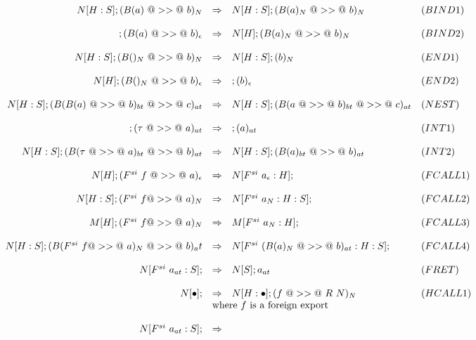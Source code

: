 \documentclass{article}
\newcommand{\hcall}{H}
\newcommand{\fcall}[2]{F^{#1}~#2}
\newcommand{\ret}[1]{R~#1}
\newcommand{\bound}[1]{B(#1)}
\begin{document}
$$
\begin{array}{rcll}
N[\hcall:S]; (\bound{a}~@>>@~b)_{N} 
	& \Rightarrow 
	& N[\hcall:S]; (\bound{a}_N~@>>@~b)_{N} & (BIND1) \\
\\
; (\bound{a}~@>>@~b)_{\epsilon} 
	& \Rightarrow 
	& N[\hcall]; (\bound{a}_N~@>>@~b)_{N} & (BIND2) \\
\\
N[\hcall:S]; (\bound{}_N~@>>@~b)_N 
	& \Rightarrow 
	& N[\hcall:S]; (b)_N & (END1) \\
\\
N[\hcall]; (\bound{}_N~@>>@~b)_{\epsilon} 
	& \Rightarrow 
	& ; (b)_{\epsilon} & (END2) \\
\\
N[\hcall:S]; (\bound{\bound{a}~@>>@~b}_{bt}~@>>@~c)_{at} 
	& \Rightarrow 
	& N[\hcall:S]; (\bound{a~@>>@~b}_{bt}~@>>@~c)_{at} & (NEST) \\
\\
; (\tau~@>>@~a)_{at} 
	& \Rightarrow 
	& ; (a)_{at} & (INT1) \\
\\
N[\hcall:S]; (\bound{\tau~@>>@~a}_{bt}~@>>@~b)_{at} 
	& \Rightarrow 
	& N[\hcall:S]; (\bound{a}_{bt}~@>>@~b)_{at} & (INT2) \\
\\
N[\hcall]; (\fcall{si}{f}~@>>@~a)_{\epsilon} 
	& \Rightarrow 
	& N[\fcall{si}{a_\epsilon}:\hcall];  & (FCALL1) \\
\\
N[\hcall:S]; (\fcall{si}{f}@>>@~a)_N 
	& \Rightarrow 
	& N[\fcall{si}{a_N}:\hcall:S];  & (FCALL2) \\
\\
M[\hcall]; (\fcall{si}{f}@>>@~a)_N
	& \Rightarrow 
	& M[\fcall{si}{a_N}:\hcall];  & (FCALL3) \\
\\
N[\hcall:S]; (\bound{\fcall{si}{f}@>>@~a}_N~@>>@~b)_at
	& \Rightarrow 
	& N[\fcall{si}{(\bound{a}_N~@>>@~b)_{at}}:\hcall:S];  & (FCALL4) \\
\\
N[\fcall{si}{a_{at}}:S];  
	& \Rightarrow 
	& N[S]; a_{at} & (FRET) \\
\\
N[\bullet];
	& \Rightarrow 
	& N[\hcall:\bullet];  (f ~@>>@~ \ret{N})_{N} & (HCALL1) \\
	& \multicolumn{2}{l}{\mbox{where $f$ is a foreign export}} \\
\\
N[\fcall{si}{a_{at}} : S]; 
	& \Rightarrow 

\end{array}$$
\end{document}
